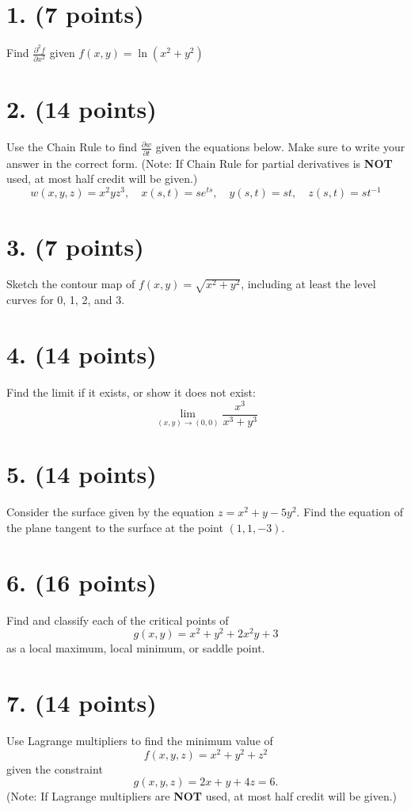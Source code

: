 \section*{1. (7 points)}
Find \( \frac{\partial^2 f}{\partial x^2} \) given \( f(x, y) = \ln(x^2 + y^2) \)

\section*{2. (14 points)}
Use the Chain Rule to find \( \frac{\partial w}{\partial t} \) given the equations below. Make sure to write your answer in the correct form. (Note: If Chain Rule for partial derivatives is \textbf{NOT} used, at most half credit will be given.)
\[
w(x, y, z) = x^2 y z^3, \quad x(s, t) = s e^{ts}, \quad y(s, t) = st, \quad z(s, t) = st^{-1}
\]

\section*{3. (7 points)}
Sketch the contour map of \( f(x, y) = \sqrt{x^2 + y^2} \), including at least the level curves for 0, 1, 2, and 3.

\section*{4. (14 points)}
Find the limit if it exists, or show it does not exist:
\[
\lim_{(x, y) \to (0, 0)} \frac{x^3}{x^3 + y^3}
\]

\section*{5. (14 points)}
Consider the surface given by the equation \( z = x^2 + y - 5y^2 \). Find the equation of the plane tangent to the surface at the point \( (1, 1, -3) \).

\section*{6. (16 points)}
Find and classify each of the critical points of 
\[
g(x, y) = x^2 + y^2 + 2x^2 y + 3
\]
as a local maximum, local minimum, or saddle point.

\section*{7. (14 points)}
Use Lagrange multipliers to find the minimum value of 
\[
f(x, y, z) = x^2 + y^2 + z^2
\]
given the constraint 
\[
g(x, y, z) = 2x + y + 4z = 6.
\]
(Note: If Lagrange multipliers are \textbf{NOT} used, at most half credit will be given.)

